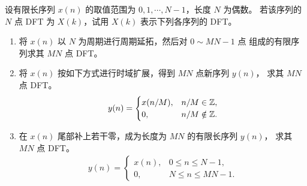 \begin{exercise}
    设有限长序列 $x(n)$ 的取值范围为 $0, 1, \cdots, N-1$，长度 $N$ 为偶数。
    若该序列的 $N$ 点 DFT 为 $X(k)$，试用 $X(k)$ 表示下列各序列的 DFT。
    \begin{enumerate}[label=(\arabic*)]
        \item 将 $x(n)$ 以 $N$ 为周期进行周期延拓，然后对 $0 \sim MN-1$ 点
            组成的有限序列求其 $MN$ 点 DFT。
        \item 将 $x(n)$ 按如下方式进行时域扩展，得到 $MN$ 点新序列 $y(n)$，
            求其 $MN$ 点 DFT。
            \begin{align*}
                y(n) = \begin{cases}
                    x(n/M), & n/M \in \mathbb{Z}, \\
                    0, & n/M \notin \mathbb{Z}.
                \end{cases}
            \end{align*}
        \item 在 $x(n)$ 尾部补上若干零，成为长度为 $MN$ 的有限长序列 $y(n)$，
            求其 $MN$ 点 DFT。
            \begin{align*}
                y(n) = \begin{cases}
                    x(n), & 0 \le n \le N - 1, \\
                    0, & N \le n \le MN - 1.
                \end{cases}
            \end{align*}
    \end{enumerate}
\end{exercise}


